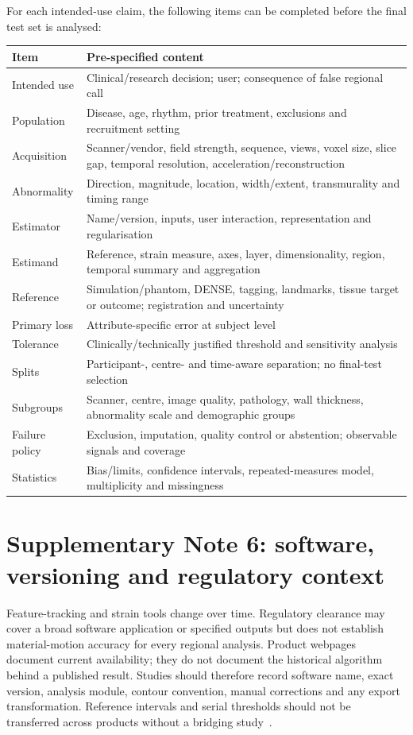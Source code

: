 \documentclass[11pt,a4paper]{article}
\begin{document}
For each intended-use claim, the following items can be completed before the final test set is analysed:

\setlength{\tabcolsep}{3pt}
\begin{longtable}{L{0.254\textwidth}L{0.709\textwidth}}
\toprule
Item & Pre-specified content \\
\midrule
Intended use & Clinical/research decision; user; consequence of false regional call \\
Population & Disease, age, rhythm, prior treatment, exclusions and recruitment setting \\
Acquisition & Scanner/vendor, field strength, sequence, views, voxel size, slice gap, temporal resolution, acceleration/reconstruction \\
Abnormality & Direction, magnitude, location, width/extent, transmurality and timing range \\
Estimator & Name/version, inputs, user interaction, representation and regularisation \\
Estimand & Reference, strain measure, axes, layer, dimensionality, region, temporal summary and aggregation \\
Reference & Simulation/phantom, DENSE, tagging, landmarks, tissue target or outcome; registration and uncertainty \\
Primary loss & Attribute-specific error at subject level \\
Tolerance & Clinically/technically justified threshold and sensitivity analysis \\
Splits & Participant-, centre- and time-aware separation; no final-test selection \\
Subgroups & Scanner, centre, image quality, pathology, wall thickness, abnormality scale and demographic groups \\
Failure policy & Exclusion, imputation, quality control or abstention; observable signals and coverage \\
Statistics & Bias/limits, confidence intervals, repeated-measures model, multiplicity and missingness \\
\bottomrule
\end{longtable}

\section*{Supplementary Note 6: software, versioning and regulatory context}

Feature-tracking and strain tools change over time. Regulatory clearance may cover a broad software application or specified outputs but does not establish material-motion accuracy for every regional analysis. Product webpages document current availability; they do not document the historical algorithm behind a published result. Studies should therefore record software name, exact version, analysis module, contour convention, manual corrections and any export transformation. Reference intervals and serial thresholds should not be transferred across products without a bridging study~\cite{lim2021,militaru2021,cao2018}.
\end{document}

